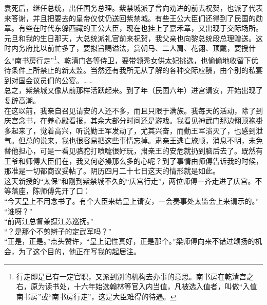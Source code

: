 袁死后，继任总统，出任国务总理。紫禁城派了曾向劝进的前去祝贺，也派了代表来答谢，并且把要去的皇帝仪仗仍送回紫禁城。有些王公大臣们还得到了民国的勋章。有些在时代东躲西藏的王公大臣，现在也挂上了嘉禾章，又出现于交际场所。元旦和我的生日那天，大总统派礼官前来祝贺，我父亲也向黎总统段总理赠送。这时内务府比以前忙多了，要拟旨赐谥法，赏朝马、二人肩、花翎、顶戴，要授什么“南书房行走”\footnote{行走即是已有一定官职，又派到别的机构去办事的意思。南书房在乾清宫之右，原为读书处，十六年始选翰林等官入内当值，凡被选入值者，叫做“入值南书房”或“南书房行走”，这是大臣难得的待遇。}、乾清门各等侍卫，要带领秀女供太妃挑选，也偷偷地收留下优待条件上所禁止的新太监。当然还有我所无从了解的各种交际应酬，由个别的私宴到对国会议员们的公宴。……\\

总之，紫禁城又像从前那样活跃起来。到了年（民国六年）进宫请安，开始出现了复辟高潮。\\

在这以前，我亲自召见请安的人还不多，而且只限于满族。我每天的活动，除了到庆宫念书，在养心殿看报，其余大部分时间还是游戏。我看见神武门那边翎顶袍褂多起来了，觉着高兴，听说勤王军发动了，尤其兴奋，而勤王军溃灭了，也感到泄气。但总的说来，我也很容易把这些事情忘掉。肃亲王逃亡旅顺，消息不明，未免替他担心，可是一看见骆驼打喷嚏很好玩，肃亲王的安危就扔到脑后去了。既然有王爷和师傅大臣们在，我又何必操那么多的心呢？到了事情由师傅告诉我的时候，那准是一切都商议妥帖了。阴历四月二十七日这天的情形就是如此。\\

这天新授的“太保”和刚到紫禁城不久的“庆宫行走”，两位师傅一齐走进了庆宫。不等落座，陈师傅先开了口：\\

“今天皇上不用念书了。有个大臣来给皇上请安，一会奏事处太监会上来请示的。”\\

“谁呀？”\\

“前两江总督兼摄江苏巡抚。”\\

“？是那个不剪辫子的定武军吗？”\\

“正是，正是。”点头赞许，“皇上记性真好，正是那个。”梁师傅向来不错过颂扬的机会，为了这个目的，他正在写我的起居注。\\


